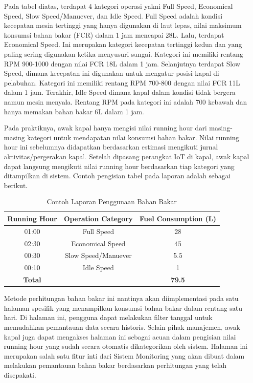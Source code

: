 Pada tabel diatas, terdapat 4 kategori operasi yakni Full Speed, Economical Speed, Slow Speed/Manuever, dan Idle Speed. Full Speed adalah kondisi kecepatan mesin tertinggi yang hanya digunakan di laut lepas, nilai maksimum konsumsi bahan bakar (FCR) dalam 1 jam mencapai 28L. Lalu, terdapat Economical Speed. Ini merupakan kategori kecepatan tertinggi kedua dan yang paling sering digunakan ketika menyusuri sungai. Kategori ini memiliki rentang RPM 900-1000 dengan nilai FCR 18L dalam 1 jam. Selanjutnya terdapat Slow Speed, dimana kecepatan ini digunakan untuk mengatur posisi kapal di pelabuhan. Kategori ini memiliki rentang RPM 700-800 dengan nilai FCR 11L dalam 1 jam. Terakhir, Idle Speed dimana kapal dalam kondisi tidak bergera namun mesin menyala. Rentang RPM pada kategori ini adalah 700 kebawah dan hanya memakan bahan bakar 6L dalam 1 jam.

Pada praktiknya, awak kapal hanya mengisi nilai running hour dari masing-masing kategori untuk mendapatan nilai konsumsi bahan bakar. Nilai running hour ini sebelumnya didapatkan berdasarkan estimasi mengikuti jurnal aktivitas/pergerakan kapal. Setelah dipasang perangkat IoT di kapal, awak kapal dapat langsung mengikuti nilai running hour berdasarkan tiap kategori yang ditampilkan di sistem. Contoh pengisian tabel pada laporan adalah sebagai berikut.


\begin{table}[!h]
    \caption{Contoh Laporan Penggunaan Bahan Bakar}
    \centering
     \begin{tabular}{c c c}
        \toprule
        Running Hour &
        Operation Category &
        Fuel Consumption (L) \\ [0.5ex]
        \midrule
        01:00   & Full Speed            & 28    \\
        02:30   & Economical Speed      & 45    \\
        00:30   & Slow Speed/Manuever   & 5.5   \\
        00:10   & Idle Speed            & 1     \\
        \textbf{Total}   &              & \textbf{79.5}     \\ [1ex]
        \bottomrule
     \end{tabular}
     \label{tab:fc-report-example}
\end{table}

Metode perhitungan bahan bakar ini nantinya akan diimplementasi pada satu halaman spesifik yang menampilkan konsumsi bahan bakar dalam rentang satu hari. Di halaman ini, pengguna dapat melakukan filter tanggal untuk memudahkan pemantauan data secara historis. Selain pihak manajemen, awak kapal juga dapat mengakses halaman ini sebagai acuan dalam pengisian nilai running hour yang sudah secara otomatis dikategorikan oleh sistem. Halaman ini merupakan salah satu fitur inti dari Sistem Monitoring yang akan dibuat dalam melakukan pemantauan bahan bakar berdasarkan perhitungan yang telah disepakati.

